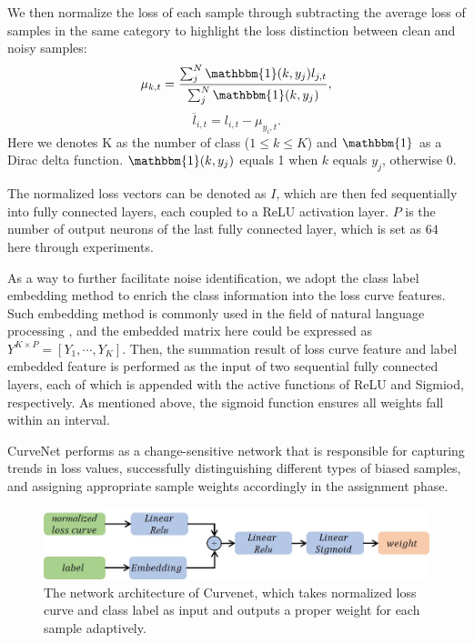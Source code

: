 \documentclass[letterpaper]{article} %
\begin{document}
We then normalize the loss of each sample through subtracting the average loss of samples in the same category to highlight the loss distinction between clean and noisy samples:
\begin{equation}
  \mu_{{k,t}} = \frac{\sum_j^N \mathbbm{1}(k,y_j)l_{j,t}}{\sum_j^N \mathbbm{1}(k,y_j)},
  \label{eq:mean}
\end{equation}
\begin{equation}
    \overline{l}_{i,t} = l_{i,t} - \mu_{y_i,t}.
    \label{eq:norm}
\end{equation}
Here we denotes K as the number of class ($1 \le k \le K$) and $\mathbbm{1}$ as a Dirac delta function.
$\mathbbm{1}(k,y_j)$ equals 1 when $k$ equals $y_j$, otherwise 0.


The normalized loss vectors can be denoted as $I$, which are then fed sequentially into fully connected layers, each coupled to a ReLU activation layer. $P$ is the number of output neurons of the last fully connected layer, which is set as $64$ here through experiments.


As a way to further facilitate noise identification, we adopt the class label embedding method to enrich the class information into the loss curve features. Such embedding method is commonly used in the field of natural language processing \cite{cao2020heteroskedastic}, and the embedded matrix here could be expressed as $Y^{K \times P} = [Y_1,\cdots,Y_K]$.
Then, the summation result of loss curve feature and label embedded feature is performed as the input of two sequential fully connected layers, each of which is appended with the active functions of ReLU and Sigmiod, respectively. As mentioned above, the sigmoid function ensures all weights fall within an interval.


CurveNet performs as a change-sensitive network that is responsible for capturing trends in loss values, successfully distinguishing different types of biased samples, and assigning appropriate sample weights accordingly in the assignment phase.


\begin{figure}[t]
\begin{center}
   \includegraphics[width=1.0\linewidth]{figs/sensinet.jpg}
\end{center}
   \caption{The network architecture of Curvenet, which takes normalized loss curve and class label as input and outputs a proper weight for each sample adaptively.
   }
\label{fig:CurveNet}
\end{figure}
\end{document}
